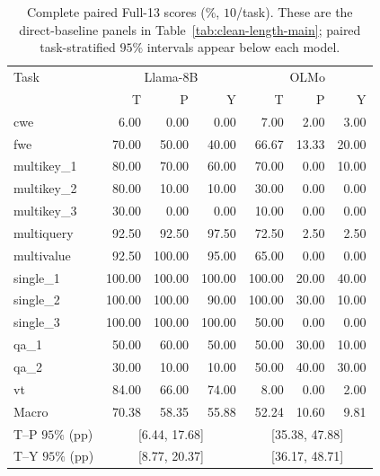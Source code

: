 \begin{table}[ht]
\centering\small
\caption{Complete paired Full-13 scores (\%, $10$/task). These are the direct-baseline panels in Table~\ref{tab:clean-length-main}; paired task-stratified $95\%$ intervals appear below each model.}
\label{tab:full13-tasks-lo}
\begin{tabular}{@{}lrrrrrr@{}}
\toprule
Task & \multicolumn{3}{c}{Llama-8B} & \multicolumn{3}{c}{OLMo} \\
 & T & P & Y & T & P & Y \\
\midrule
cwe & 6.00 & 0.00 & 0.00 & 7.00 & 2.00 & 3.00 \\
fwe & 70.00 & 50.00 & 40.00 & 66.67 & 13.33 & 20.00 \\
multikey\_1 & 80.00 & 70.00 & 60.00 & 70.00 & 0.00 & 10.00 \\
multikey\_2 & 80.00 & 10.00 & 10.00 & 30.00 & 0.00 & 0.00 \\
multikey\_3 & 30.00 & 0.00 & 0.00 & 10.00 & 0.00 & 0.00 \\
multiquery & 92.50 & 92.50 & 97.50 & 72.50 & 2.50 & 2.50 \\
multivalue & 92.50 & 100.00 & 95.00 & 65.00 & 0.00 & 0.00 \\
single\_1 & 100.00 & 100.00 & 100.00 & 100.00 & 20.00 & 40.00 \\
single\_2 & 100.00 & 100.00 & 90.00 & 100.00 & 30.00 & 10.00 \\
single\_3 & 100.00 & 100.00 & 100.00 & 50.00 & 0.00 & 0.00 \\
qa\_1 & 50.00 & 60.00 & 50.00 & 50.00 & 30.00 & 10.00 \\
qa\_2 & 30.00 & 10.00 & 10.00 & 50.00 & 40.00 & 30.00 \\
vt & 84.00 & 66.00 & 74.00 & 8.00 & 0.00 & 2.00 \\
\midrule
Macro & 70.38 & 58.35 & 55.88 & 52.24 & 10.60 & 9.81 \\
T--P $95\%$ (pp) & \multicolumn{3}{c}{[6.44, 17.68]} & \multicolumn{3}{c}{[35.38, 47.88]} \\
T--Y $95\%$ (pp) & \multicolumn{3}{c}{[8.77, 20.37]} & \multicolumn{3}{c}{[36.17, 48.71]} \\
\bottomrule
\end{tabular}
\end{table}
